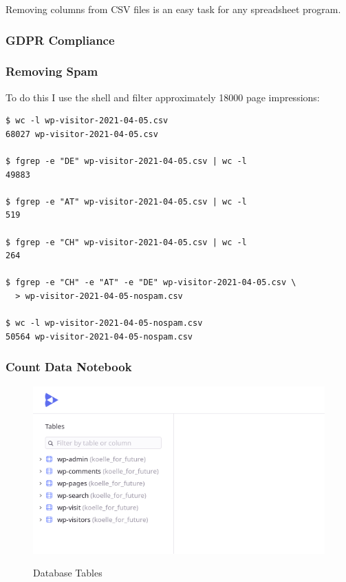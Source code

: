 Removing columns from CSV files is an easy task for any spreadsheet program.

\subsubsection{GDPR Compliance}

\subsubsection{Removing Spam}

To do this I use the shell and filter approximately 18000 page impressions:

\begin{lstlisting}[caption=Removing Spam, frame=single, basicstyle=\ttfamily]
$ wc -l wp-visitor-2021-04-05.csv
68027 wp-visitor-2021-04-05.csv

$ fgrep -e "DE" wp-visitor-2021-04-05.csv | wc -l
49883

$ fgrep -e "AT" wp-visitor-2021-04-05.csv | wc -l
519

$ fgrep -e "CH" wp-visitor-2021-04-05.csv | wc -l
264

$ fgrep -e "CH" -e "AT" -e "DE" wp-visitor-2021-04-05.csv \
  > wp-visitor-2021-04-05-nospam.csv

$ wc -l wp-visitor-2021-04-05-nospam.csv 
50564 wp-visitor-2021-04-05-nospam.csv
\end{lstlisting}

\subsubsection{Count Data Notebook}

\begin{figure}[H]
\centering
\caption {Database Tables}
\includegraphics[width=\linewidth]{images/tables.png}
\label{fig:tablesCount}
\end{figure}

